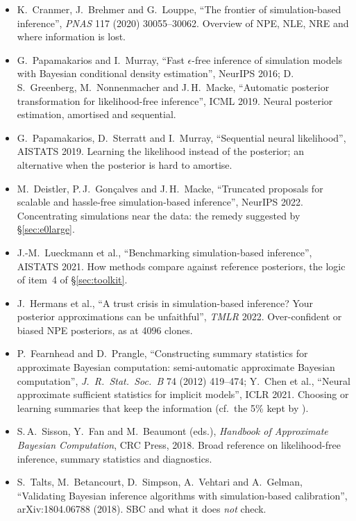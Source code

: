 \documentclass[11pt]{article}
\theoremstyle{definition}
\theoremstyle{remark}
\newcommand{\code}[1]{\texttt{\detokenize{#1}}}
\begin{document}
\begin{itemize}
\item[S1$^\star$] K.\ Cranmer, J.\ Brehmer and G.\ Louppe, ``The frontier of simulation-based inference'', \emph{PNAS} 117 (2020) 30055--30062. Overview of NPE, NLE, NRE and where information is lost.
\item[S2] G.\ Papamakarios and I.\ Murray, ``Fast $\epsilon$-free inference of simulation models with Bayesian conditional density estimation'', NeurIPS 2016; D.\,S.\ Greenberg, M.\ Nonnenmacher and J.\,H.\ Macke, ``Automatic posterior transformation for likelihood-free inference'', ICML 2019. Neural posterior estimation, amortised and sequential.
\item[S3] G.\ Papamakarios, D.\ Sterratt and I.\ Murray, ``Sequential neural likelihood'', AISTATS 2019. Learning the likelihood instead of the posterior; an alternative when the posterior is hard to amortise.
\item[S4] M.\ Deistler, P.\,J.\ Gon\c{c}alves and J.\,H.\ Macke, ``Truncated proposals for scalable and hassle-free simulation-based inference'', NeurIPS 2022. Concentrating simulations near the data: the remedy suggested by \S\ref{sec:e0large}.
\item[S5] J.-M.\ Lueckmann et al., ``Benchmarking simulation-based inference'', AISTATS 2021. How methods compare against reference posteriors, the logic of item~4 of \S\ref{sec:toolkit}.
\item[S6$^\star$] J.\ Hermans et al., ``A trust crisis in simulation-based inference? Your posterior approximations can be unfaithful'', \emph{TMLR} 2022. Over-confident or biased NPE posteriors, as at 4096 clones.
\item[S7] P.\ Fearnhead and D.\ Prangle, ``Constructing summary statistics for approximate Bayesian computation: semi-automatic approximate Bayesian computation'', \emph{J.\ R.\ Stat.\ Soc.\ B} 74 (2012) 419--474; Y.\ Chen et al., ``Neural approximate sufficient statistics for implicit models'', ICLR 2021. Choosing or learning summaries that keep the information (cf.\ the 5\% kept by \code{moments}).
\item[S8$^\star$] S.\,A.\ Sisson, Y.\ Fan and M.\ Beaumont (eds.), \emph{Handbook of Approximate Bayesian Computation}, CRC Press, 2018. Broad reference on likelihood-free inference, summary statistics and diagnostics.
\item[S9] S.\ Talts, M.\ Betancourt, D.\ Simpson, A.\ Vehtari and A.\ Gelman, ``Validating Bayesian inference algorithms with simulation-based calibration'', arXiv:1804.06788 (2018). SBC and what it does \emph{not} check.

\end{itemize}
\end{document}
